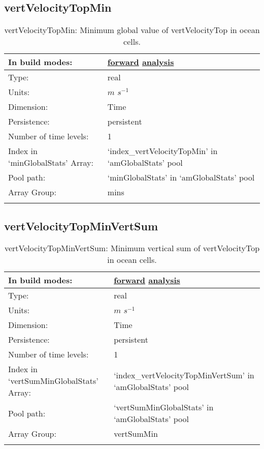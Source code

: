 \subsection[vertVelocityTopMin]{vertVelocityTopMin}
\label{subsec:var_sec_amGlobalStats_vertVelocityTopMin}
\begin{center}
\begin{longtable}{| p{2.0in} | p{4.0in} |}
        \hline 
        In build modes: & \hyperref[subsec:forward_var_tab_amGlobalStats]{forward} \hyperref[subsec:analysis_var_tab_amGlobalStats]{analysis} \\
        \hline 
        Type: & real \\
        \hline 
        Units: & $m$ $s^{-1}$ \\
        \hline 
        Dimension: & Time \\
        \hline 
        Persistence: & persistent \\
        \hline 
        Number of time levels: & 1 \\
        \hline 
		 Index in `minGlobalStats' Array: & `index\_vertVelocityTopMin' in `amGlobalStats' pool \\
		 \hline 
            Pool path: & `minGlobalStats' in `amGlobalStats' pool \\
		 \hline 
		 Array Group: & mins \\
		 \hline 
    \caption{vertVelocityTopMin: Minimum global value of vertVelocityTop in ocean cells.}
\end{longtable}
\end{center}
\subsection[vertVelocityTopMinVertSum]{vertVelocityTopMinVertSum}
\label{subsec:var_sec_amGlobalStats_vertVelocityTopMinVertSum}
\begin{center}
\begin{longtable}{| p{2.0in} | p{4.0in} |}
        \hline 
        In build modes: & \hyperref[subsec:forward_var_tab_amGlobalStats]{forward} \hyperref[subsec:analysis_var_tab_amGlobalStats]{analysis} \\
        \hline 
        Type: & real \\
        \hline 
        Units: & $m$ $s^{-1}$ \\
        \hline 
        Dimension: & Time \\
        \hline 
        Persistence: & persistent \\
        \hline 
        Number of time levels: & 1 \\
        \hline 
		 Index in `vertSumMinGlobalStats' Array: & `index\_vertVelocityTopMinVertSum' in `amGlobalStats' pool \\
		 \hline 
            Pool path: & `vertSumMinGlobalStats' in `amGlobalStats' pool \\
		 \hline 
		 Array Group: & vertSumMin \\
		 \hline 
    \caption{vertVelocityTopMinVertSum: Minimum vertical sum of vertVelocityTop in ocean cells.}
\end{longtable}
\end{center}
